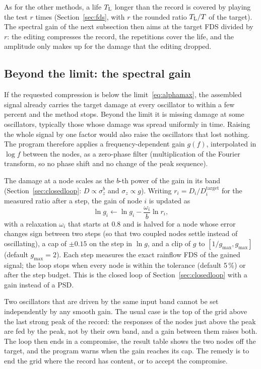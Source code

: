 As for the other methods, a life $T_{\mathrm{L}}$ longer than the record is covered by playing the test $r$ times
(Section~\ref{sec:fds}, with $r$ the rounded ratio $T_{\mathrm{L}}/T$ of the target). The spectral gain of the
next subsection then aims at the target FDS divided by $r$: the editing compresses the record, the
repetitions cover the life, and the amplitude only makes up for the damage that the editing dropped.

\subsection{Beyond the limit: the spectral gain}\label{sec:gain}

If the requested compression is below the limit~\eqref{eq:alphamax}, the assembled signal already
carries the target damage at every oscillator to within a few percent and the method stops. Beyond the
limit it is missing damage at some oscillators, typically those whose damage was spread uniformly in
time. Raising the whole signal by one factor would also raise the oscillators that lost nothing. The
program therefore applies a frequency-dependent gain $g(f)$, interpolated in $\log f$ between the
nodes, as a zero-phase filter (multiplication of the Fourier transform, so no phase shift and no change
of the peak sequence).

The damage at a node scales as the $b$-th power of the gain in its band (Section~\ref{sec:closedloop}:
$D\propto\sigma_z^b$ and $\sigma_z\propto g$). Writing $r_i = D_i/D_i^{\mathrm{target}}$ for the measured
ratio after a step, the gain of node $i$ is updated as
\begin{equation}\label{eq:gainstep}
  \ln g_i \leftarrow \ln g_i - \frac{\omega_i}{b}\ln r_i ,
\end{equation}
with a relaxation $\omega_i$ that starts at 0.8 and is halved for a node whose error changes sign
between two steps (so that two coupled nodes settle instead of oscillating), a cap of $\pm0.15$ on the
step in $\ln g$, and a clip of $g$ to $[1/g_{\max}, g_{\max}]$ (default $g_{\max} = 2$). Each step
measures the exact rainflow FDS of the gained signal; the loop stops when every node is within the
tolerance (default 5\,\%) or after the step budget. This is the closed loop of
Section~\ref{sec:closedloop} with a gain instead of a PSD.

Two oscillators that are driven by the same input band cannot be set independently by any smooth
gain. The usual case is the top of the grid above the last strong peak of the record: the responses of
the nodes just above the peak are fed by the peak, not by their own band, and a gain between them
raises both. The loop then ends in a compromise, the result table shows the two nodes off the target,
and the program warns when the gain reaches its cap. The remedy is to end the grid where the record
has content, or to accept the compromise.

